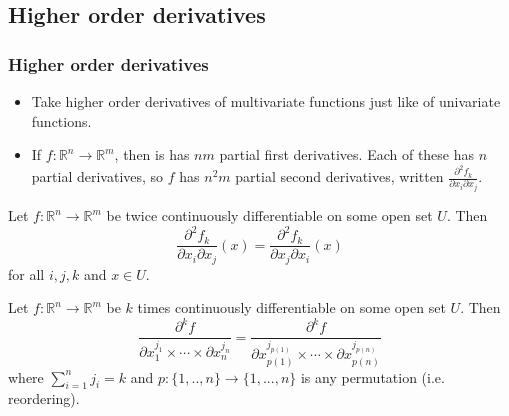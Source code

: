 \documentclass[compress]{beamer}
\def\R{\mathbb{R}}
\renewcommand{\to}{{\rightarrow}}
\begin{document}
\subsection{Higher order derivatives}
\begin{frame}\frametitle{Higher order derivatives}
  \begin{itemize}
  \item Take higher order derivatives of multivariate functions just
    like of univariate functions. 
  \item If $f: \R^n \to \R^m$, then is has $nm$
    partial first derivatives. Each of these has $n$ partial derivatives,
    so $f$ has $n^2m$ partial second derivatives, written
    $\frac{\partial^2 f_k}{\partial x_i \partial x_j}$. 
  \end{itemize}
\end{frame}
\begin{frame}
  \begin{theorem}
    Let $f: \R^n \to \R^m$ be twice continuously differentiable on some
    open set $U$. Then
    \[ \frac{\partial^2 f_k}{\partial x_i \partial
      x_j}(x) =  \frac{\partial^2 f_k}{\partial x_j \partial
      x_i} (x) \]
    for all $i,j,k$ and $ x \in U$.
  \end{theorem}
  \begin{corollary}
    Let $f: \R^n \to \R^m$ be $k$ times continuously differentiable on
    some open set $U$. Then 
    \[ \frac{\partial^k f}{\partial x_1^{j_1} \times \cdots
      \times \partial x_n^{j_n}} = 
    \frac{\partial^k f}{\partial x_{p(1)}^{j_{p(1)}} \times \cdots \times \partial
      x_{p(n)}^{j_{p(n)}}} \]
    where $\sum_{i=1}^n j_i = k$ and $p:\{1,..,n\} \to \{1,...,n\}$ is
    any permutation (i.e. reordering).
  \end{corollary}
\end{frame}
\end{document}
